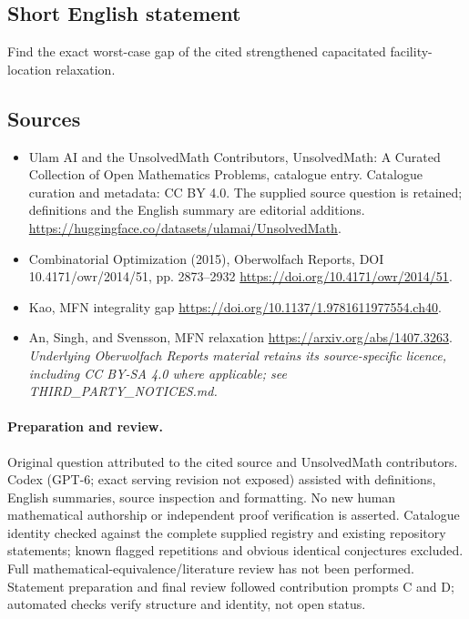 \documentclass[11pt]{article}
\begin{document}
\subsection{Short English statement}
Find the exact worst-case gap of the cited strengthened capacitated facility-location relaxation.
\subsection{Sources}
\begin{itemize}
\item[\hypertarget{source:statement:1}{S1}] Ulam AI and the UnsolvedMath Contributors, UnsolvedMath: A Curated Collection of Open Mathematics Problems, catalogue entry. Catalogue curation and metadata: CC BY 4.0. The supplied source question is retained; definitions and the English summary are editorial additions.
\url{https://huggingface.co/datasets/ulamai/UnsolvedMath}.
\item[\hypertarget{source:statement:2}{S2}] Combinatorial Optimization (2015), Oberwolfach Reports, DOI 10.4171/owr/2014/51, pp. 2873--2932
\url{https://doi.org/10.4171/owr/2014/51}.
\item[\hypertarget{source:statement:3}{S3}] Kao, MFN integrality gap
\url{https://doi.org/10.1137/1.9781611977554.ch40}.
\item[\hypertarget{source:statement:4}{S4}] An, Singh, and Svensson, MFN relaxation
\url{https://arxiv.org/abs/1407.3263}.
\textit{Underlying Oberwolfach Reports material retains its source-specific licence, including CC BY-SA 4.0 where applicable; see THIRD\_PARTY\_NOTICES.md.}
\end{itemize}
\paragraph{Preparation and review.}
Original question attributed to the cited source and UnsolvedMath contributors. Codex (GPT-6; exact serving revision not exposed) assisted with definitions, English summaries, source inspection and formatting. No new human mathematical authorship or independent proof verification is asserted. Catalogue identity checked against the complete supplied registry and existing repository statements; known flagged repetitions and obvious identical conjectures excluded. Full mathematical-equivalence/literature review has not been performed. Statement preparation and final review followed contribution prompts C and D; automated checks verify structure and identity, not open status.
\label{end:statement}
\end{document}
